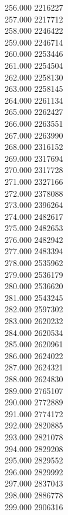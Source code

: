 { 256.000	2216227 \\
 257.000	2217712 \\
 258.000	2246422 \\
 259.000	2246714 \\
 260.000	2253446 \\
 261.000	2254504 \\
 262.000	2258130 \\
 263.000	2258145 \\
 264.000	2261134 \\
 265.000	2262427 \\
 266.000	2263551 \\
 267.000	2263990 \\
 268.000	2316152 \\
 269.000	2317694 \\
 270.000	2317728 \\
 271.000	2327166 \\
 272.000	2378088 \\
 273.000	2396264 \\
 274.000	2482617 \\
 275.000	2482653 \\
 276.000	2482942 \\
 277.000	2483394 \\
 278.000	2535962 \\
 279.000	2536179 \\
 280.000	2536620 \\
 281.000	2543245 \\
 282.000	2597302 \\
 283.000	2620232 \\
 284.000	2620534 \\
 285.000	2620961 \\
 286.000	2624022 \\
 287.000	2624321 \\
 288.000	2624830 \\
 289.000	2765107 \\
 290.000	2772889 \\
 291.000	2774172 \\
 292.000	2820885 \\
 293.000	2821078 \\
 294.000	2829208 \\
 295.000	2829552 \\
 296.000	2829992 \\
 297.000	2837043 \\
 298.000	2886778 \\
 299.000	2906316 \\
}
